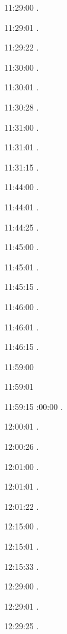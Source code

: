 \documentclass[italian]{article}
\begin{document}
11:29:00   . 

11:29:01   . 

11:29:22   . 

11:30:00   .

11:30:01   .

11:30:28   .

11:31:00   .

11:31:01   .

11:31:15   .

11:44:00   .

11:44:01   .

11:44:25   .

11:45:00   .

11:45:01   .

11:45:15   .

11:46:00   .

11:46:01   .

11:46:15   .

11:59:00   

11:59:01   

11:59:15   
:00:00   .

12:00:01  .

12:00:26   .

12:01:00    . 

12:01:01    . 

12:01:22    . 

12:15:00   . 

12:15:01    . 

12:15:33    . 

12:29:00    . 

12:29:01    .

12:29:25    .
\end{document}
